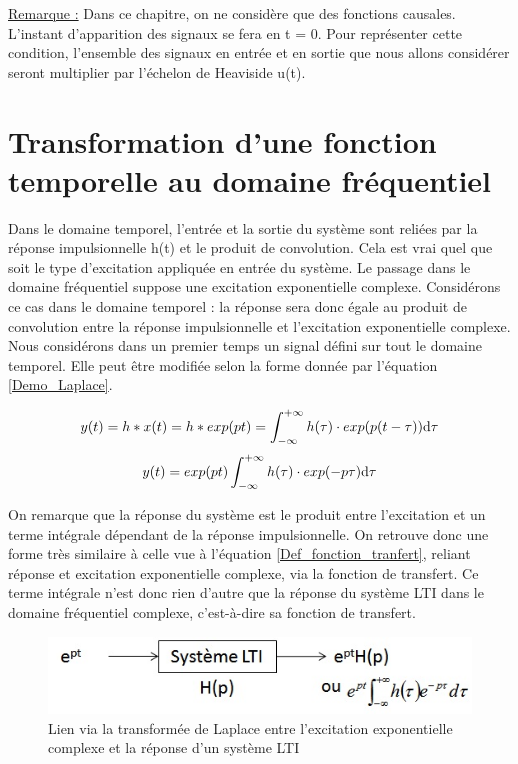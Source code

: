 	\vspace{0.5\baselineskip}
	\underline{Remarque :}
	Dans ce chapitre, on ne considère que des fonctions causales. L'instant d'apparition des signaux se fera en t = 0. Pour représenter cette condition, l'ensemble des signaux en entrée et en sortie que nous allons considérer seront multiplier par l'échelon de Heaviside u(t).
	\vspace{1\baselineskip}
	
	\section{Transformation d'une fonction temporelle au domaine fréquentiel}
	Dans le domaine temporel, l'entrée et la sortie du système sont reliées par la réponse impulsionnelle h(t) et le produit de convolution. Cela est vrai quel que soit le type d'excitation appliquée en entrée du système. Le passage dans le domaine fréquentiel suppose une excitation exponentielle complexe. Considérons ce cas dans le domaine temporel : la réponse sera donc égale au produit de convolution entre la réponse impulsionnelle et l'excitation exponentielle complexe. Nous considérons dans un premier temps un signal défini sur tout le domaine temporel. Elle peut être modifiée selon la forme donnée par l'équation \ref{Demo_Laplace}.
	
	\begin{equation}\label{}
	y(t) = h*x(t) = h * exp(pt) = \int_{-\infty}^{+\infty} h(\tau) \cdot exp(p(t-\tau))
 \mathrm{d} \tau 	
 	\end{equation}
	\begin{equation}\label{Demo_Laplace}
	y(t) = exp(pt) \int_{-\infty}^{+\infty} h(\tau) \cdot exp(-p\tau)
	\mathrm{d} \tau 	
	\end{equation}
	
	On remarque que la réponse du système est le produit entre l'excitation et un terme intégrale dépendant de la réponse impulsionnelle. On retrouve donc une forme très similaire à celle vue à l'équation \ref{Def_fonction_tranfert}, reliant réponse et excitation exponentielle complexe, via la fonction de transfert. Ce terme intégrale n'est donc rien d'autre que la réponse du système LTI dans le domaine fréquentiel complexe, c'est-à-dire sa fonction de transfert.
	\begin{figure}[h!]
		\centering
		\includegraphics[scale=0.7]{images/LTI_Laplace.jpg}
		\caption{Lien via la transformée de Laplace entre l'excitation exponentielle complexe et la réponse d'un système LTI}	
		\label{Fig:LTI_Laplace} 
	\end{figure}
	

